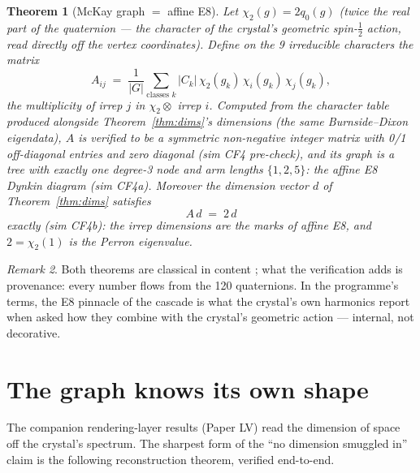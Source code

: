 \documentclass[12pt]{article}
\newtheorem{theorem}{Theorem}
\theoremstyle{definition}
\theoremstyle{remark}
\newtheorem{remark}[theorem]{Remark}
\begin{document}
\begin{theorem}[McKay graph $=$ affine E8]\label{thm:mckay}
Let $\chi_2(g) = 2q_0(g)$ (twice the real part of the quaternion --- the character of the crystal's geometric spin-$\tfrac12$ action, read directly off the vertex coordinates). Define on the 9 irreducible characters the matrix
$$A_{ij} \;=\; \frac{1}{|G|}\sum_{\text{classes } k} |C_k|\, \chi_2(g_k)\, \chi_i(g_k)\, \chi_j(g_k),$$
the multiplicity of irrep $j$ in $\chi_2 \otimes$ irrep $i$. Computed from the character table produced alongside Theorem~\ref{thm:dims}'s dimensions (the same Burnside--Dixon eigendata), $A$ is verified to be a symmetric non-negative integer matrix with 0/1 off-diagonal entries and zero diagonal (sim CF4 pre-check), and its graph is a \emph{tree} with exactly one degree-3 node and arm lengths $\{1, 2, 5\}$: the affine E8 Dynkin diagram (sim CF4a). Moreover the dimension vector $d$ of Theorem~\ref{thm:dims} satisfies
$$A\,d \;=\; 2\,d$$
exactly (sim CF4b): the irrep dimensions are the marks of affine E8, and $2 = \chi_2(1)$ is the Perron eigenvalue.
\end{theorem}

\begin{remark}
Both theorems are classical in content \citep{McKay1980}; what the verification adds is provenance: every number flows from the 120 quaternions. In the programme's terms, the E8 pinnacle of the cascade is what the crystal's own harmonics report when asked how they combine with the crystal's geometric action --- internal, not decorative.
\end{remark}

\section{The graph knows its own shape}\label{sec:graph}

The companion rendering-layer results (Paper LV) read the dimension of space off the crystal's spectrum. The sharpest form of the ``no dimension smuggled in'' claim is the following reconstruction theorem, verified end-to-end.
\end{document}
